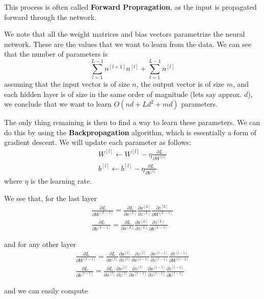 \documentclass{article}
\begin{document}
This process is often called \textbf{Forward Propragation}, as the input is propagated forward through the network.

We note that all the weight matrices and bias vectors parametrize the neural network.
These are the values that we want to learn from the data.
We can see that the number of parameters is
$$
\sum_{l=1}^{L-1} n^{[l+1]} n^{[l]} + \sum_{l=1}^{L-1} n^{[l]}
$$
assuming that the input vector is of size $n$, the output vector is of size $m$, and each hidden layer is of size in the same order of magnitude (lets say approx. $d$), we conclude that we want to learn $O(nd + Ld^2 + md)$ parameters.

The only thing remaining is then to find a way to learn these parameters.
We can do this by using the \textbf{Backpropagation} algorithm, which is essentially a form of gradient descent.
We will update each parameter as follows:
\begin{gather*}
W^{[l]} \leftarrow W^{[l]} - \eta \frac{\partial L}{\partial W^{[l]}} \\
b^{[l]} \leftarrow b^{[l]} - \eta \frac{\partial L}{\partial b^{[l]}}
\end{gather*}
where $\eta$ is the learning rate.

We see that, for the last layer
\begin{gather*}
\frac{\partial L}{\partial W^{[L-1]}} = \frac{\partial L}{\partial x^{[L]}} \frac{\partial x^{[L]}}{\partial z^{[L]}} \frac{\partial z^{[L]}}{\partial W^{[L-1]}} \\
\frac{\partial L}{\partial b^{[L-1]}} = \frac{\partial L}{\partial x^{[L]}} \frac{\partial x^{[L]}}{\partial z^{[L]}} \frac{\partial z^{[L]}}{\partial b^{[L-1]}}
\end{gather*}

and for any other layer
\begin{gather*}
\frac{\partial L}{\partial W^{[l-1]}} = \frac{\partial L}{\partial x^{[l]}} \frac{\partial x^{[l]}}{\partial z^{[l]}} \frac{\partial z^{[l]}}{\partial x^{[l-1]}} \frac{\partial x^{[l-1]}}{\partial z^{[l-1]}} \frac{\partial z^{[l-1]}}{\partial W^{[l-1]}} \\
\frac{\partial L}{\partial b^{[l-1]}} = \frac{\partial L}{\partial x^{[l]}} \frac{\partial x^{[l]}}{\partial z^{[l]}} \frac{\partial z^{[l]}}{\partial x^{[l-1]}} \frac{\partial x^{[l-1]}}{\partial z^{[l-1]}} \frac{\partial z^{[l-1]}}{\partial b^{[l-1]}}
\end{gather*}

and we can easily compute
\end{document}
